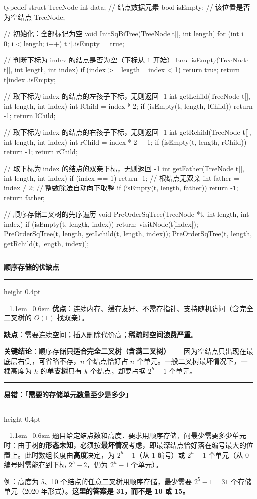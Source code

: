 \documentclass[11pt,openany,UTF8]{ctexbook}
\newcommand{\callouthead}[2]{%
  \par\addvspace{7pt}\noindent
  {\color{#1}\rule[-0.15em]{3pt}{1.05em}}\hspace{0.5em}%
  {\bfseries\color{#1}#2}\par\nobreak\vspace{-0.35em}%
  {\color{rulesep}\hrule height 0.4pt}\nobreak\vspace{0.45em}%
  \begingroup\small\setlength{\parindent}{0pt}%
  \leftskip=1.1em\rightskip=0.6em\noindent\ignorespaces}
\newcommand{\calloutend}{\par\endgroup\addvspace{7pt}}
\newenvironment{callkey}[1]{\callouthead{keybar}{#1}}{\calloutend}
\newenvironment{callwarn}[1]{\callouthead{warnbar}{#1}}{\calloutend}
\begin{document}
\begin{codebox}
typedef struct TreeNode {
    int data;        // 结点数据元素
    bool isEmpty;    // 该位置是否为空结点
} TreeNode;

// 初始化：全部标记为空
void InitSqBiTree(TreeNode t[], int length) {
    for (int i = 0; i < length; i++)
        t[i].isEmpty = true;
}

// 判断下标为 index 的结点是否为空（下标从 1 开始）
bool isEmpty(TreeNode t[], int length, int index) {
    if (index >= length || index < 1) return true;
    return t[index].isEmpty;
}

// 取下标为 index 的结点的左孩子下标，无则返回 -1
int getLchild(TreeNode t[], int length, int index) {
    int lChild = index * 2;
    if (isEmpty(t, length, lChild)) return -1;
    return lChild;
}

// 取下标为 index 的结点的右孩子下标，无则返回 -1
int getRchild(TreeNode t[], int length, int index) {
    int rChild = index * 2 + 1;
    if (isEmpty(t, length, rChild)) return -1;
    return rChild;
}

// 取下标为 index 的结点的双亲下标，无则返回 -1
int getFather(TreeNode t[], int length, int index) {
    if (index == 1) return -1;              // 根结点无双亲
    int father = index / 2;                 // 整数除法自动向下取整
    if (isEmpty(t, length, father)) return -1;
    return father;
}

// 顺序存储二叉树的先序遍历
void PreOrderSqTree(TreeNode *t, int length, int index) {
    if (isEmpty(t, length, index)) return;
    visitNode(t[index]);
    PreOrderSqTree(t, length, getLchild(t, length, index));
    PreOrderSqTree(t, length, getRchild(t, length, index));
}
\end{codebox}

\begin{callkey}{顺序存储的优缺点}
\textbf{优点}：连续内存、缓存友好、不需存指针、支持随机访问（含完全二叉树的 $O(1)$ 找双亲）。

\textbf{缺点}：需要连续空间；插入删除代价高；\textbf{稀疏时空间浪费严重}。

\textbf{关键结论}：顺序存储\textbf{只适合完全二叉树（含满二叉树）}——因为空结点只出现在最底层右侧，可省略不存，$n$ 个结点恰好占 $n$ 个单元。一般二叉树最坏情况下，一棵高度为 $h$ 的\textbf{单支树}只有 $h$ 个结点，却要占据 $2^h-1$ 个单元。

\end{callkey}

\begin{callwarn}{易错：「需要的存储单元数量至少是多少」}
题目给定结点数和高度、要求用顺序存储，问最少需要多少单元时：由于树的\textbf{形态未知}，必须按\textbf{最坏情况}考虑，即最深结点恰好落在编号最大的位置上。此时数组长度由\textbf{高度}决定，为 $2^h-1$（从 1 编号）或 $2^h-1$ 个单元（从 0 编号时需能存到下标 $2^h-2$，仍为 $2^h-1$ 个单元）。

例：高度为 5、10 个结点的任意二叉树用顺序存储，最少需要 $2^5-1=31$ 个存储单元（2020 年形式）。\textbf{这里的答案是 31，而不是 10 或 15。}

\end{callwarn}
\end{document}
